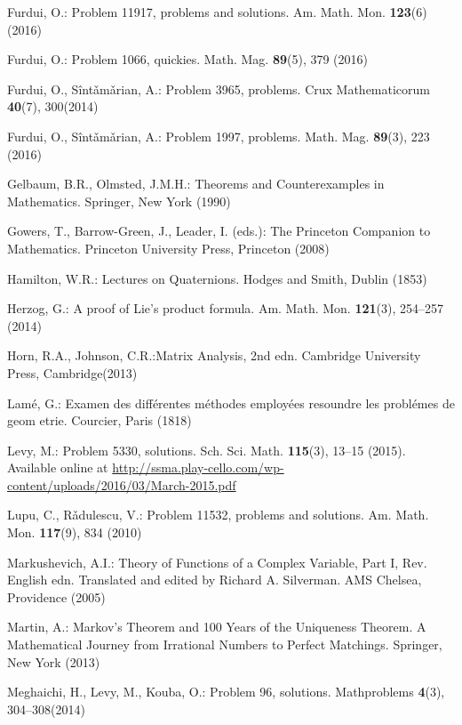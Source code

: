 \begin{thebibliography}{99}
  Furdui, O.: Problem 11917, problems and solutions. Am. Math. Mon. \textbf{123}(6) (2016)

  Furdui, O.: Problem 1066, quickies. Math. Mag. \textbf{89}(5), 379 (2016)

  Furdui, O., S\^int\v am\v arian, A.: Problem 3965, problems. Crux Mathematicorum \textbf{40}(7), 300(2014)

  Furdui, O., S\^int\v am\v arian, A.: Problem 1997, problems. Math. Mag. \textbf{89}(3), 223 (2016)

  Gelbaum, B.R., Olmsted, J.M.H.: Theorems and Counterexamples in Mathematics. Springer,
  New York (1990)

  Gowers, T., Barrow-Green, J., Leader, I. (eds.): The Princeton Companion to Mathematics.
  Princeton University Press, Princeton (2008)

  Hamilton, W.R.: Lectures on Quaternions. Hodges and Smith, Dublin (1853)

  Herzog, G.: A proof of Lie’s product formula. Am. Math. Mon. \textbf{121}(3), 254–257 (2014)

  Horn, R.A., Johnson, C.R.:Matrix Analysis, 2nd edn. Cambridge University Press, Cambridge(2013)

  Lam\'e, G.: Examen des diff\'erentes m\'ethodes employ\'ees resoundre les probl\'emes de geom etrie.
  Courcier, Paris (1818)

  Levy, M.: Problem 5330, solutions. Sch. Sci. Math. \textbf{115}(3), 13–15 (2015). Available online at
  \href{http://ssma.play-cello.com/wp-content/uploads/2016/03/March-2015.pdf}{http://ssma.play-cello.com/wp-content/uploads/2016/03/March-2015.pdf}

  Lupu, C., R\v adulescu, V.: Problem 11532, problems and solutions. Am. Math. Mon. \textbf{117}(9), 834
(2010)

  Markushevich, A.I.: Theory of Functions of a Complex Variable, Part I, Rev. English edn.
  Translated and edited by Richard A. Silverman. AMS Chelsea, Providence (2005)

  Martin, A.: Markov’s Theorem and 100 Years of the Uniqueness Theorem. A Mathematical
  Journey from Irrational Numbers to Perfect Matchings. Springer, New York (2013)

  Meghaichi, H., Levy, M., Kouba, O.: Problem 96, solutions. Mathproblems \textbf{4}(3), 304–308(2014)


\end{thebibliography}
